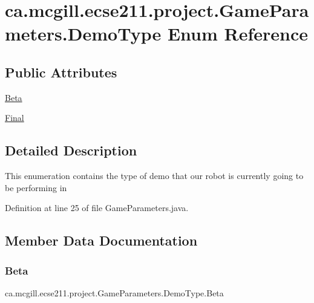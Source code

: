 \hypertarget{enumca_1_1mcgill_1_1ecse211_1_1project_1_1_game_parameters_1_1_demo_type}{}\section{ca.\+mcgill.\+ecse211.\+project.\+Game\+Parameters.\+Demo\+Type Enum Reference}
\label{enumca_1_1mcgill_1_1ecse211_1_1project_1_1_game_parameters_1_1_demo_type}
\subsection*{Public Attributes}
\begin{DoxyCompactItemize}
\item 
\hyperlink{enumca_1_1mcgill_1_1ecse211_1_1project_1_1_game_parameters_1_1_demo_type_a8d4e576df991cb52b50ae54b2812aa7f}{Beta}
\item 
\hyperlink{enumca_1_1mcgill_1_1ecse211_1_1project_1_1_game_parameters_1_1_demo_type_a1ba3e060bfd5f76af77b713321abc7f6}{Final}
\end{DoxyCompactItemize}


\subsection{Detailed Description}
This enumeration contains the type of demo that our robot is currently going to be performing in 

Definition at line 25 of file Game\+Parameters.\+java.



\subsection{Member Data Documentation}
\mbox{\label{enumca_1_1mcgill_1_1ecse211_1_1project_1_1_game_parameters_1_1_demo_type_a8d4e576df991cb52b50ae54b2812aa7f}} 
\subsubsection{\texorpdfstring{Beta}{Beta}}
{\footnotesize\ttfamily ca.\+mcgill.\+ecse211.\+project.\+Game\+Parameters.\+Demo\+Type.\+Beta}



